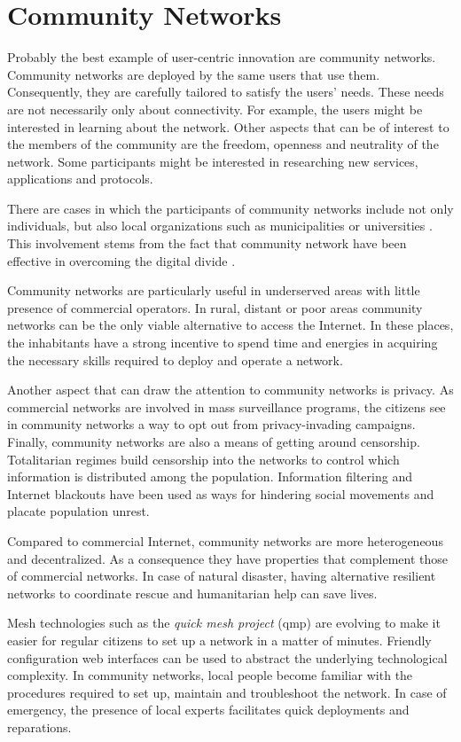 \documentclass[journal]{IEEEtran}
\begin{document}
\section{Community Networks}
\label{sec:community-networks}

Probably the best example of user-centric innovation are community networks.
Community networks are deployed by the same users that use them.
Consequently, they are carefully tailored to satisfy the users' needs.
These needs are not necessarily only about connectivity.
For example, the users might be interested in learning about the network.
Other aspects that can be of interest to the members of the community are the freedom, openness and neutrality of the network.
Some participants might be interested in researching  new services, applications and protocols.

There are cases in which the participants of community networks include not only individuals, but also local organizations such as municipalities or universities \cite{bogliolo2007uwc}.
This involvement stems from the fact that community network have been effective in overcoming the digital divide \cite{oliver2010wca}.

Community networks are particularly useful in underserved areas with little presence of commercial operators.
In rural, distant or poor areas community networks can be the only viable alternative to access the Internet.
In these places, the inhabitants have a strong incentive to spend time and energies in acquiring the necessary skills required to deploy and operate a network.

Another aspect that can draw the attention to community networks is privacy.
As commercial networks are involved in mass surveillance programs, the citizens see in community networks a way to opt out from privacy-invading campaigns.
Finally, community networks are also a means of getting around censorship.
Totalitarian regimes build censorship into the networks to control which information is distributed among the population.
Information filtering and Internet blackouts have been used as ways for hindering social movements and placate population unrest. 

Compared to commercial Internet, community networks are more heterogeneous and decentralized.
As a consequence they have properties that complement those of commercial networks.
In case of natural disaster, having alternative resilient networks to coordinate rescue and humanitarian help can save lives.

Mesh technologies such as the \emph{quick mesh project} (qmp) are evolving to make it easier for regular citizens to set up a network in a matter of minutes.
Friendly configuration web interfaces can be used to abstract the underlying technological complexity.
In community networks, local people become familiar with the procedures required to set up, maintain and troubleshoot the network.
In case of emergency, the presence of local experts facilitates quick deployments and reparations. 
\end{document}

